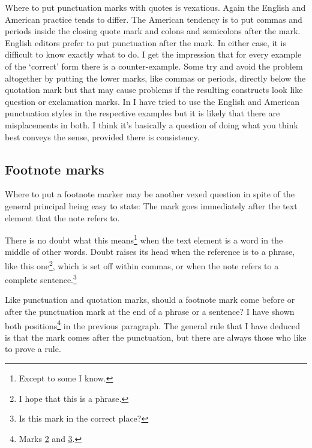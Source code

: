 \documentclass[10pt,letterpaper,extrafontsizes]{memoir}
\begin{document}
    Where to put punctuation marks with quotes is vexatious. Again the
English and American practice tends to differ. The American tendency is
to put commas and periods inside the closing quote mark and colons and
semicolons after the mark. English editors prefer to put punctuation
after the mark.
In either case, it is difficult
to know exactly what to do. I get the impression that for every example
of the `correct' form there is a counter-example.
Some try and avoid the problem altogether by putting the lower marks, 
like commas or periods, 
directly below the quotation mark but that may cause problems if the 
resulting constructs look like question or exclamation marks. 
In  I have tried to use the English and American 
punctuation styles in the respective examples but it is likely that there
are misplacements in both. I think it's basically a question of doing what
you think best conveys the sense, provided there is consistency.

\subsection{Footnote marks}

    Where to put a footnote marker may be another vexed question in spite
of the general principal being easy to state: The mark goes immediately
after the text element that the note refers to.

    There is no doubt what this means\footnote{Except to some I know.} when
the text element is a word in the middle of other words. Doubt raises
its head when the reference is to a phrase, like this one\footnote{I hope
that this is a phrase.\label{fn:phrase}}, 
which is set off within commas, or when the note refers to a complete 
sentence.\footnote{Is this mark in the correct place?\label{fn:sentence}}

    Like punctuation and quotation marks, 
should a footnote mark come before
or after the punctuation mark at the end of a phrase or a sentence? I have
shown both positions\footnote{Marks \ref{fn:phrase} and \ref{fn:sentence}.}
 in the previous paragraph. The 
general rule that I have deduced is that the mark comes after the 
punctuation, but there are always those who like to prove a rule.

\end{document}
